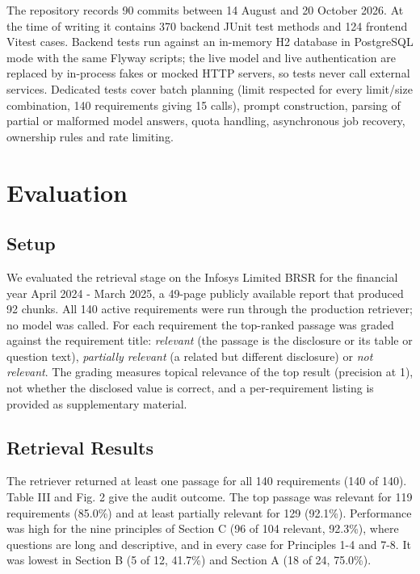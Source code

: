 \documentclass[conference]{IEEEtran}
\begin{document}
The repository records 90 commits between 14 August and 20 October 2026. At the time of writing it contains 370 backend JUnit test methods and 124 frontend Vitest cases. Backend tests run against an in-memory H2 database in PostgreSQL mode with the same Flyway scripts; the live model and live authentication are replaced by in-process fakes or mocked HTTP servers, so tests never call external services. Dedicated tests cover batch planning (limit respected for every limit/size combination, 140 requirements giving 15 calls), prompt construction, parsing of partial or malformed model answers, quota handling, asynchronous job recovery, ownership rules and rate limiting.

\section{Evaluation}
\subsection{Setup}
We evaluated the retrieval stage on the Infosys Limited BRSR for the financial year April 2024 - March 2025, a 49-page publicly available report that produced 92 chunks. All 140 active requirements were run through the production retriever; no model was called. For each requirement the top-ranked passage was graded against the requirement title: \textit{relevant} (the passage is the disclosure or its table or question text), \textit{partially relevant} (a related but different disclosure) or \textit{not relevant}. The grading measures topical relevance of the top result (precision at 1), not whether the disclosed value is correct, and a per-requirement listing is provided as supplementary material.

\subsection{Retrieval Results}
The retriever returned at least one passage for all 140 requirements (140 of 140). Table III and Fig. 2 give the audit outcome. The top passage was relevant for 119 requirements (85.0\%) and at least partially relevant for 129 (92.1\%). Performance was high for the nine principles of Section C (96 of 104 relevant, 92.3\%), where questions are long and descriptive, and in every case for Principles 1-4 and 7-8. It was lowest in Section B (5 of 12, 41.7\%) and Section A (18 of 24, 75.0\%).
\end{document}
